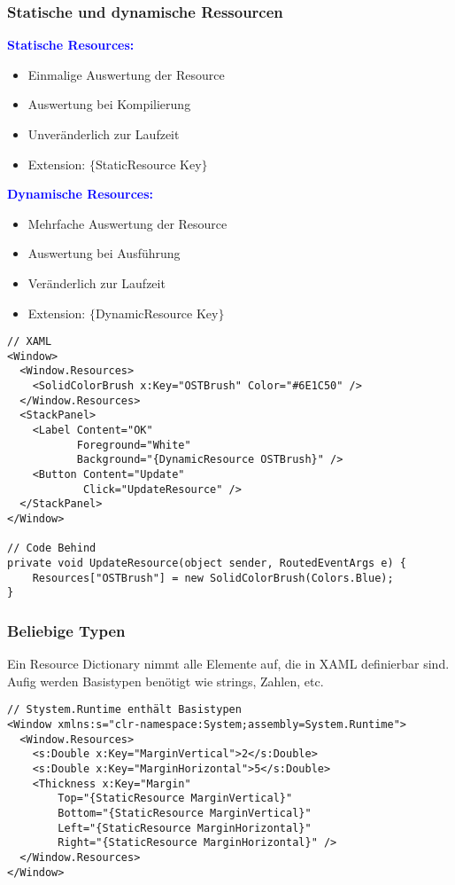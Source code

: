 \subsubsection{Statische und dynamische Ressourcen}
\textbf{\textcolor{blue}{Statische Resources:}}
\begin{itemize}[topsep=0pt, leftmargin=4mm]
    \setlength\itemsep{-0.3em}
    \item Einmalige Auswertung der Resource
    \item Auswertung bei Kompilierung
    \item Unveränderlich zur Laufzeit
    \item Extension: $\{$StaticResource Key$\}$
\end{itemize}
\textbf{\textcolor{blue}{Dynamische Resources:}}
\begin{itemize}[topsep=0pt, leftmargin=4mm]
    \setlength\itemsep{-0.3em}
    \item Mehrfache Auswertung der Resource
    \item Auswertung bei Ausführung
    \item Veränderlich zur Laufzeit
    \item Extension: $\{$DynamicResource Key$\}$
\end{itemize}
\begin{lstlisting}
// XAML
<Window>
  <Window.Resources>
    <SolidColorBrush x:Key="OSTBrush" Color="#6E1C50" />
  </Window.Resources>
  <StackPanel>
    <Label Content="OK"
           Foreground="White"
           Background="{DynamicResource OSTBrush}" />
    <Button Content="Update"
            Click="UpdateResource" />
  </StackPanel>
</Window>

// Code Behind
private void UpdateResource(object sender, RoutedEventArgs e) {
    Resources["OSTBrush"] = new SolidColorBrush(Colors.Blue);
}
\end{lstlisting}
\subsubsection{Beliebige Typen}
Ein Resource Dictionary nimmt alle Elemente auf, die in XAML definierbar sind. Aufig werden Basistypen benötigt wie strings, Zahlen, etc.
\begin{lstlisting}
// Stystem.Runtime enthält Basistypen
<Window xmlns:s="clr-namespace:System;assembly=System.Runtime">
  <Window.Resources>
    <s:Double x:Key="MarginVertical">2</s:Double>
    <s:Double x:Key="MarginHorizontal">5</s:Double>
    <Thickness x:Key="Margin"
        Top="{StaticResource MarginVertical}"
        Bottom="{StaticResource MarginVertical}"
        Left="{StaticResource MarginHorizontal}"
        Right="{StaticResource MarginHorizontal}" />
  </Window.Resources>
</Window>
\end{lstlisting}
